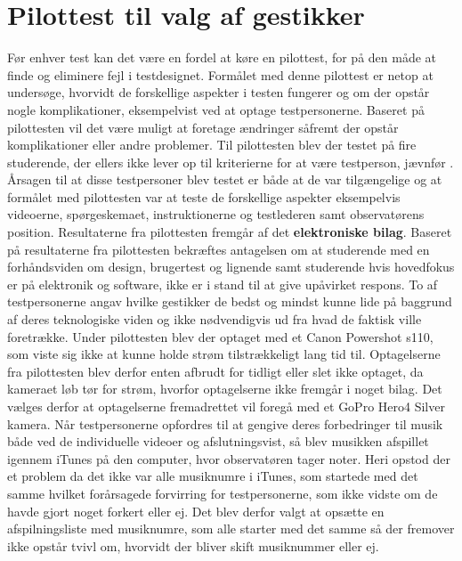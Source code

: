 \section{Pilottest til valg af gestikker}
\label{PilottestValgAfGestikker}
%
Før enhver test kan det være en fordel at køre en pilottest, for på den måde at finde og eliminere fejl i testdesignet. Formålet med denne pilottest er netop at undersøge, hvorvidt de forskellige aspekter i testen fungerer og om der opstår nogle komplikationer, eksempelvist ved at optage testpersonerne. Baseret på pilottesten vil det være muligt at foretage ændringer såfremt der opstår komplikationer eller andre problemer.\blankline
%  
Til pilottesten blev der testet på fire studerende, der ellers ikke lever op til kriterierne for at være testperson, jævnfør . Årsagen til at disse testpersoner blev testet er både at de var tilgængelige og at formålet med pilottesten var at teste de forskellige aspekter eksempelvis videoerne, spørgeskemaet, instruktionerne og testlederen samt observatørens position. Resultaterne fra pilottesten fremgår af det \textbf{elektroniske bilag}. Baseret på resultaterne fra pilottesten bekræftes antagelsen om at studerende med en forhåndsviden om design, brugertest og lignende samt studerende hvis hovedfokus er på elektronik og software, ikke er i stand til at give upåvirket respons. To af testpersonerne angav hvilke gestikker de bedst og mindst kunne lide på baggrund af deres teknologiske viden og ikke nødvendigvis ud fra hvad de faktisk ville foretrække.\blankline
% 
Under pilottesten blev der optaget med et Canon Powershot s110, som viste sig ikke at kunne holde strøm tilstrækkeligt lang tid til. Optagelserne fra pilottesten blev derfor enten afbrudt for tidligt eller slet ikke optaget, da kameraet løb tør for strøm, hvorfor optagelserne ikke fremgår i noget bilag. Det vælges derfor at optagelserne fremadrettet vil foregå med et GoPro Hero4 Silver kamera.\blankline
% 
Når testpersonerne opfordres til at gengive deres forbedringer til musik både ved de individuelle videoer og afslutningsvist, så blev musikken afspillet igennem iTunes på den computer, hvor observatøren tager noter. Heri opstod der et problem da det ikke var alle musiknumre i iTunes, som startede med det samme hvilket forårsagede forvirring for testpersonerne, som ikke vidste om de havde gjort noget forkert eller ej. Det blev derfor valgt at opsætte en afspilningsliste med musiknumre, som alle starter med det samme så der fremover ikke opstår tvivl om, hvorvidt der bliver skift musiknummer eller ej. 

